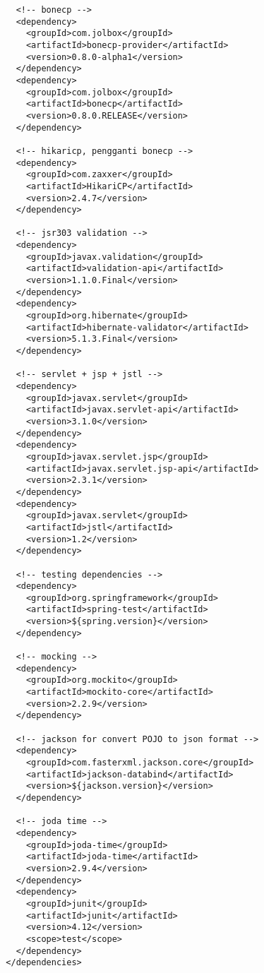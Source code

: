 \documentclass[pdftex,12pt, oneside]{article}
\begin{document}
\begin{lstlisting}
    <!-- bonecp -->
    <dependency>
      <groupId>com.jolbox</groupId>
      <artifactId>bonecp-provider</artifactId>
      <version>0.8.0-alpha1</version>
    </dependency>
    <dependency>
      <groupId>com.jolbox</groupId>
      <artifactId>bonecp</artifactId>
      <version>0.8.0.RELEASE</version>
    </dependency>

    <!-- hikaricp, pengganti bonecp -->
    <dependency>
      <groupId>com.zaxxer</groupId>
      <artifactId>HikariCP</artifactId>
      <version>2.4.7</version>
    </dependency>

    <!-- jsr303 validation -->
    <dependency>
      <groupId>javax.validation</groupId>
      <artifactId>validation-api</artifactId>
      <version>1.1.0.Final</version>
    </dependency>
    <dependency>
      <groupId>org.hibernate</groupId>
      <artifactId>hibernate-validator</artifactId>
      <version>5.1.3.Final</version>
    </dependency>

    <!-- servlet + jsp + jstl -->
    <dependency>
      <groupId>javax.servlet</groupId>
      <artifactId>javax.servlet-api</artifactId>
      <version>3.1.0</version>
    </dependency>
    <dependency>
      <groupId>javax.servlet.jsp</groupId>
      <artifactId>javax.servlet.jsp-api</artifactId>
      <version>2.3.1</version>
    </dependency>
    <dependency>
      <groupId>javax.servlet</groupId>
      <artifactId>jstl</artifactId>
      <version>1.2</version>
    </dependency>

    <!-- testing dependencies -->
    <dependency>
      <groupId>org.springframework</groupId>
      <artifactId>spring-test</artifactId>
      <version>${spring.version}</version>
    </dependency>

    <!-- mocking -->
    <dependency>
      <groupId>org.mockito</groupId>
      <artifactId>mockito-core</artifactId>
      <version>2.2.9</version>
    </dependency>

    <!-- jackson for convert POJO to json format -->
    <dependency>
      <groupId>com.fasterxml.jackson.core</groupId>
      <artifactId>jackson-databind</artifactId>
      <version>${jackson.version}</version>
    </dependency>

    <!-- joda time -->
    <dependency>
      <groupId>joda-time</groupId>
      <artifactId>joda-time</artifactId>
      <version>2.9.4</version>
    </dependency>
    <dependency>
      <groupId>junit</groupId>
      <artifactId>junit</artifactId>
      <version>4.12</version>
      <scope>test</scope>
    </dependency>
  </dependencies>


\end{lstlisting}
\end{document}
